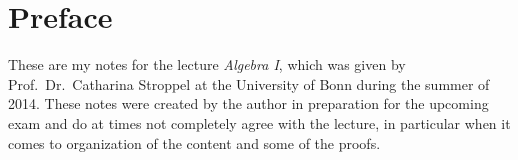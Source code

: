 \chapter*{Preface}

These are my notes for the lecture \emph{Algebra I}, which was given by Prof.\ Dr.\ Catharina Stroppel at the University of Bonn during the summer of 2014.
These notes were created by the author in preparation for the upcoming exam and do at times not completely agree with the lecture, in particular when it comes to organization of the content and some of the proofs.
